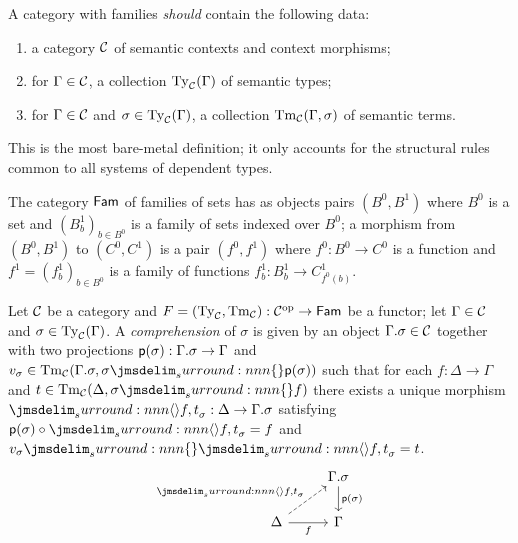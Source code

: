 \documentclass[a4paper]{article}
\begin{document}
A category with families \emph{should} contain the following data:
\begin{enumerate}
\item a category $\mathcal{C}$ of semantic contexts and context morphisms;
\item for $\Gamma \in \mathcal{C}$, a collection $\operatorname{Ty}_{\mathcal{C}}(\Gamma)$ of semantic types;
\item for $\Gamma \in \mathcal{C}$ and $\sigma \in \operatorname{Ty}_{\mathcal{C}}(\Gamma)$, a collection $\operatorname{Tm}_{\mathcal{C}}(\Gamma,\sigma)$ of semantic terms.
\end{enumerate}

This is the most bare-metal definition; it only accounts for the structural rules common to all systems of dependent types.

\begin{definition}
  The category $\mathsf{Fam}$ of families of sets has as objects pairs $(B^0,B^1)$ where $B^0$ is a set and $(B^1_b)_{b \in B^0}$ is a family of sets indexed over $B^0$; a morphism from $(B^0,B^1)$ to $(C^0,C^1)$ is a pair $(f^0,f^1)$ where $f^0 : B^0 \to C^0$ is a function and $f^1 = (f^1_b)_{b \in B^0}$ is a family of functions $f^1_b : B^1_b \to C^1_{f^0(b)}$.
\end{definition}

\begin{definition}
  Let $\mathcal{C}$ be a category and $F = (\operatorname{Ty}_{\mathcal{C}},\operatorname{Tm}_{\mathcal{C}}) : \mathcal{C}^{\mathrm{op}} \to \mathsf{Fam}$ be a functor; let $\Gamma \in \mathcal{C}$ and $\sigma \in \operatorname{Ty}_{\mathcal{C}}(\Gamma)$.
  A \emph{comprehension} of $\sigma$ is given by an object $\Gamma.\sigma \in \mathcal{C}$ together with two projections $\operatorname{\mathsf{p}}(\sigma) : \Gamma.\sigma \to \Gamma$ and $v_{\sigma} \in \Tm{\cC}(\Gamma.\sigma, \semSubst{\sigma}{\ctxExt(\sigma)})$ such that for each $f : \Delta \to \Gamma$ and $t \in \Tm{\cC}(\Delta,\semSubst{\sigma}{f})$ there exists a unique morphism $\semComp{f}{t}{\sigma} : \Delta \to \Gamma.\sigma$ satisfying $\ctxExt(\sigma) \circ \semComp{f}{t}{\sigma} = f$ and $\semSubst{v_{\sigma}}{\semComp{f}{t}{\sigma}} = t$.
  \[\begin{tikzcd}
      & {\Gamma.\sigma} \\
      \Delta & \Gamma
      \arrow["{\ctxExt(\sigma)}", from=1-2, to=2-2]
      \arrow["{\semComp{f}{t}{\sigma}}", dashed, from=2-1, to=1-2]
      \arrow["f"', from=2-1, to=2-2]
    \end{tikzcd}\]
\end{definition}
\end{document}
